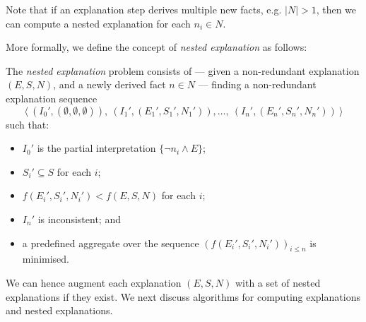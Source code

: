 Note that if an explanation step derives multiple new facts, e.g. $|N| > 1$, then we can compute a nested explanation for each $n_i \in N$.

More formally, we define the concept of \emph{nested explanation} as follows:

\begin{definition}\label{def:nested-problem}
The \emph{nested explanation} problem consists of --- given a non-redundant explanation $(E, S, N)$, and a newly derived fact $n \in N$ --- finding a non-redundant explanation sequence 
    \[\langle \ (I_0',(\emptyset,\emptyset,\emptyset)),\ (I_1',(E_1',S_1',N_1')), \dots ,\ (I_n',(E_n',S_n',N_n')) \ \rangle\]
    such that:
    \begin{itemize}
        \item $I_0'$ is the partial interpretation $\{ \neg n_i \wedge E \}$;
        \item $S_i'\subseteq S$ for each $i$;
        \item $f(E_i',S_i',N_i')< f(E, S, N)$ for each $i$; 
        \item $I_n'$ is inconsistent; and
        \item a predefined aggregate over the sequence $\left(f(E_i',S_i',N_i')\right)_{i\leq n}$ is minimised.
    \end{itemize}
\end{definition}

We can hence augment each explanation $(E,S,N)$ with a set of nested explanations if they exist. We next discuss algorithms for computing explanations and nested explanations.



